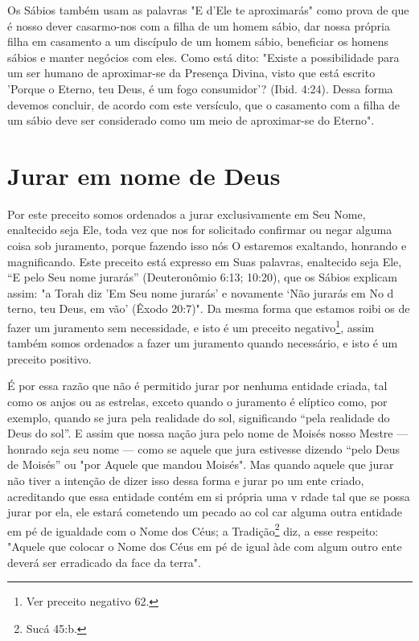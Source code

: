 Os Sábios também usam as palavras "E d'Ele te aproximarás" como prova de
que é nosso dever casarmo-nos com a filha de um homem sábio, dar nossa
própria filha em casamento a um discípulo de um homem sábio, benefi­ciar
os homens sábios e manter negócios com eles. Como está dito: "Existe a
possibilidade para um ser humano de aproximar-se da Presença Divina,
visto que está escrito 'Porque o Eterno, teu Deus, é um fogo
consumidor'? (Ibid. 4:24). Dessa forma devemos concluir, de acordo com
este versículo, que o casamen­to com a filha de um sábio deve ser
considerado como um meio de aproximar-se do Eterno".


\section{Jurar em nome de Deus}


Por este preceito somos ordenados a jurar exclusivamente em Seu Nome,
enaltecido seja Ele, toda vez que nos for solicitado confirmar ou negar
alguma coisa sob juramento, porque fazendo isso nós O estaremos
exaltando, honrando e magnificando. Este preceito está expresso em Suas
palavras, enal­tecido seja Ele, ``E pelo Seu nome jurarás'' (Deuteronômio
6:13; 10:20), que os Sábios explicam assim: "a Torah diz 'Em Seu nome
jurarás' e novamente `Não jurarás em No d terno, teu Deus, em vão'
(Êxodo 20:7)". Da mesma forma que estamos roibi os de fazer um juramento
sem necessidade, e isto é um preceito negativo\footnote{Ver preceito negativo 62.}, assim
também somos ordenados a fazer um juramen­to quando necessário, e isto é
um preceito positivo.

É por essa razão que não é permitido jurar por nenhuma entidade criada,
tal como os anjos ou as estrelas, exceto quando o juramento é elíptico
como, por exemplo, quando se jura pela realidade do sol, significando
``pela realidade do Deus do sol''. E assim que nossa nação jura pelo nome
de Moisés nosso Mestre --- honrado seja seu nome --- como se aquele que
jura estivesse dizendo ``pelo Deus de Moisés'' ou "por Aquele que mandou
Moisés". Mas quan­do aquele que jurar não tiver a intenção de dizer isso
dessa forma e jurar po um ente criado, acreditando que essa entidade
contém em si própria uma v r­dade tal que se possa jurar por ela, ele
estará cometendo um pecado ao col car alguma outra entidade em pé de
igualdade com o Nome dos Céus; a Tradição\footnote{Sucá 45:b.} diz, a esse
respeito: "Aquele que colocar o Nome dos Céus em pé de igual àde com
algum outro ente deverá ser erradicado da face da terra".

